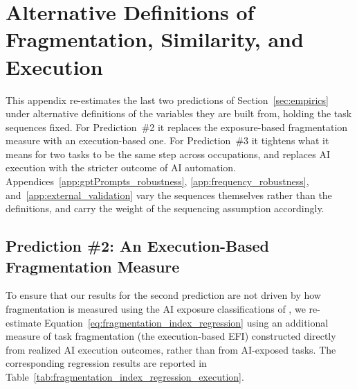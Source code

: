 \section{Alternative Definitions of Fragmentation, Similarity, and Execution}
\label{app:additional_robustness}
\suppressfloats[t]

This appendix re-estimates the last two predictions of Section~\ref{sec:empirics} under alternative definitions of the variables they are built from, holding the task sequences fixed.
For Prediction~\#2 it replaces the exposure-based fragmentation measure with an execution-based one.
For Prediction~\#3 it tightens what it means for two tasks to be the same step across occupations, and replaces AI execution with the stricter outcome of AI automation.
Appendices~\ref{app:gptPrompts_robustness}, \ref{app:frequency_robustness}, and~\ref{app:external_validation} vary the sequences themselves rather than the definitions, and carry the weight of the sequencing assumption accordingly.

\subsection{Prediction \#2: An Execution-Based Fragmentation Measure}
\label{app:additional_robustness_pred2}
To ensure that our results for the second prediction are not driven by how fragmentation is measured using the AI exposure classifications of \citet{eloundou2023gpts}, we re-estimate Equation~\eqref{eq:fragmentation_index_regression} using an additional measure of task fragmentation (the execution-based EFI) constructed directly from realized AI execution outcomes, rather than from AI-exposed tasks.
The corresponding regression results are reported in Table~\ref{tab:fragmentation_index_regression_execution}.

